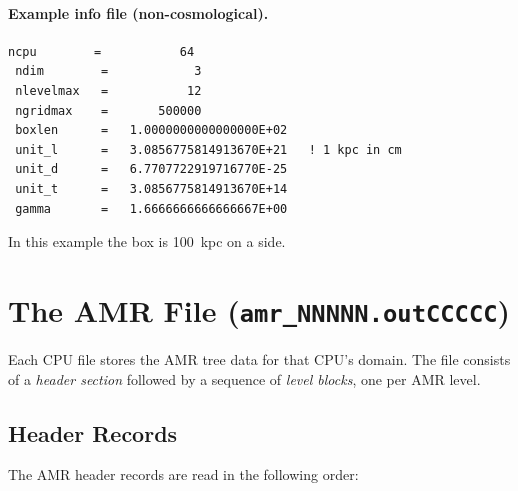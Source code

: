 \documentclass[english,a4paper]{my_memo}
\begin{document}
\paragraph{Example info file (non-cosmological).}
\begin{lstlisting}[style=shellstyle]
 ncpu        =           64
 ndim        =            3
 nlevelmax   =           12
 ngridmax    =       500000
 boxlen      =   1.0000000000000000E+02
 unit_l      =   3.0856775814913670E+21   ! 1 kpc in cm
 unit_d      =   6.7707722919716770E-25
 unit_t      =   3.0856775814913670E+14
 gamma       =   1.6666666666666667E+00
\end{lstlisting}

In this example the box is 100~kpc on a side.

\section{The AMR File (\texttt{amr\_NNNNN.outCCCCC})}

Each CPU file stores the AMR tree data for that CPU's domain.  The file
consists of a \emph{header section} followed by a sequence of
\emph{level blocks}, one per AMR level.

\subsection{Header Records}

The AMR header records are read in the following order:
\end{document}
